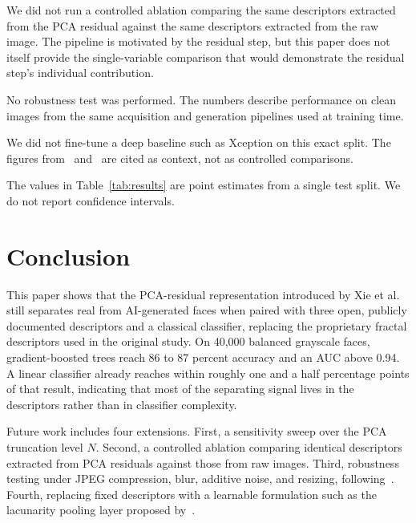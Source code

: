 \documentclass[runningheads]{llncs}
\begin{document}
We did not run a controlled ablation comparing the same descriptors extracted from the PCA residual against the same descriptors extracted from the raw image. The pipeline is motivated by the residual step, but this paper does not itself provide the single-variable comparison that would demonstrate the residual step's individual contribution.

No robustness test was performed. The numbers describe performance on clean images from the same acquisition and generation pipelines used at training time.

We did not fine-tune a deep baseline such as Xception on this exact split. The figures from~\cite{yasir2025} and~\cite{rossler2019} are cited as context, not as controlled comparisons.

The values in Table~\ref{tab:results} are point estimates from a single test split. We do not report confidence intervals.


\section{Conclusion}
\label{sec:conclusion}

This paper shows that the PCA-residual representation introduced by Xie et al.~\cite{xie2026} still separates real from AI-generated faces when paired with three open, publicly documented descriptors and a classical classifier, replacing the proprietary fractal descriptors used in the original study. On 40,000 balanced grayscale faces, gradient-boosted trees reach 86 to 87 percent accuracy and an AUC above 0.94. A linear classifier already reaches within roughly one and a half percentage points of that result, indicating that most of the separating signal lives in the descriptors rather than in classifier complexity.

Future work includes four extensions. First, a sensitivity sweep over the PCA truncation level $N$. Second, a controlled ablation comparing identical descriptors extracted from PCA residuals against those from raw images. Third, robustness testing under JPEG compression, blur, additive noise, and resizing, following~\cite{giudice2021}. Fourth, replacing fixed descriptors with a learnable formulation such as the lacunarity pooling layer proposed by~\cite{mohan2024}.
\end{document}
